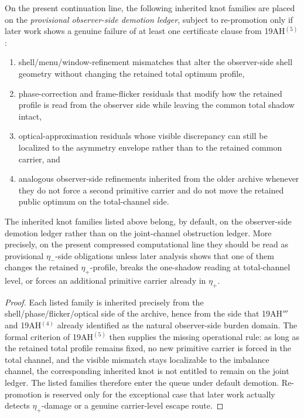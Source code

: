 \begin{definition}
On the present continuation line, the following inherited knot families are placed on the \emph{provisional observer-side demotion ledger}, subject to re-promotion only if later work shows a genuine failure of at least one certificate clause from 19AH$^{(5)}$:
\begin{enumerate}[leftmargin=2em]
  \item shell/menu/window-refinement mismatches that alter the observer-side shell geometry without changing the retained total optimum profile,
  \item phase-correction and frame-flicker residuals that modify how the retained profile is read from the observer side while leaving the common total shadow intact,
  \item optical-approximation residuals whose visible discrepancy can still be localized to the asymmetry envelope rather than to the retained common carrier, and
  \item analogous observer-side refinements inherited from the older archive whenever they do not force a second primitive carrier and do not move the retained public optimum on the total-channel side.
\end{enumerate}
\end{definition}

\begin{proposition}
The inherited knot families listed above belong, by default, on the observer-side demotion ledger rather than on the joint-channel obstruction ledger. More precisely, on the present compressed computational line they should be read as provisional \(\eta_-\)-side obligations unless later analysis shows that one of them changes the retained \(\eta_+\)-profile, breaks the one-shadow reading at total-channel level, or forces an additional primitive carrier already in \(\eta_+\).
\end{proposition}

\begin{proof}
Each listed family is inherited precisely from the shell/phase/flicker/optical side of the archive, hence from the side that 19AH$'''$ and 19AH$^{(4)}$ already identified as the natural observer-side burden domain. The formal criterion of 19AH$^{(5)}$ then supplies the missing operational rule: as long as the retained total profile remains fixed, no new primitive carrier is forced in the total channel, and the visible mismatch stays localizable to the imbalance channel, the corresponding inherited knot is not entitled to remain on the joint ledger. The listed families therefore enter the queue under default demotion. Re-promotion is reserved only for the exceptional case that later work actually detects \(\eta_+\)-damage or a genuine carrier-level escape route.
\end{proof}


